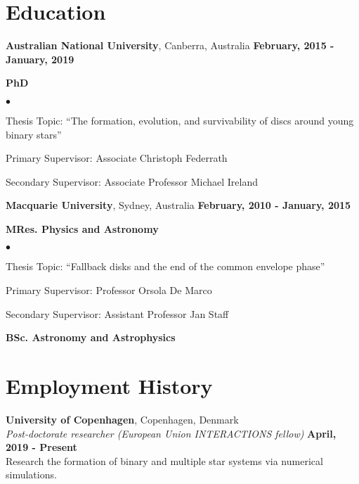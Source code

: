 \documentclass[margin,line]{res}
\newenvironment{list1}{
	\begin{list}{\ding{113}}{%
			\setlength{\itemsep}{0in}
			\setlength{\parsep}{0in} \setlength{\parskip}{0in}
			\setlength{\topsep}{0in} \setlength{\partopsep}{0in} 
			\setlength{\leftmargin}{0.17in}}}{\end{list}}
\newenvironment{list2}{
	\begin{list}{$\bullet$}{%
			\setlength{\itemsep}{0in}
			\setlength{\parsep}{0in} \setlength{\parskip}{0in}
			\setlength{\topsep}{0in} \setlength{\partopsep}{0in} 
			\setlength{\leftmargin}{0.2in}}}{\end{list}}
\begin{document}
\begin{resume}
		\section{\sc Education}
		{\bf Australian National University}, Canberra, Australia \hfill {\bf February, 2015 - January, 2019}\\
		\vspace*{-.1in}
		\begin{list1}
			\item[] {\bf PhD}
			\begin{list2}
				\vspace*{.05in}
				\item Thesis Topic:  ``The formation, evolution, and survivability of discs around young binary stars'' 
				\item Primary Supervisor: Associate Christoph Federrath
				\item Secondary Supervisor: Associate Professor Michael Ireland
			\end{list2}
		\end{list1}
		{\bf Macquarie University}, Sydney, Australia \hfill {\bf February, 2010 - January, 2015}\\ 
		\vspace*{-.1in}
		\begin{list1}
			\item[] {\bf MRes. Physics and Astronomy}
			\begin{list2}
				\vspace*{.05in}
				\item Thesis Topic:  ``Fallback disks and the end of the common envelope phase'' 
				\item Primary Supervisor:  Professor Orsola De Marco
				\item Secondary Supervisor: Assistant Professor Jan Staff
			\end{list2}
			\vspace*{.05in}
			\item[] {\bf BSc. Astronomy and Astrophysics}
		\end{list1}
		
		\section{\sc Employment History}
		{\bf University of Copenhagen}, Copenhagen, Denmark\\
		{\em Post-doctorate researcher (European Union INTERACTIONS fellow)} \hfill {\bf April, 2019 - Present}\\
		Research the formation of binary and multiple star systems via numerical simulations.\\
		

\end{resume}
\end{document}
